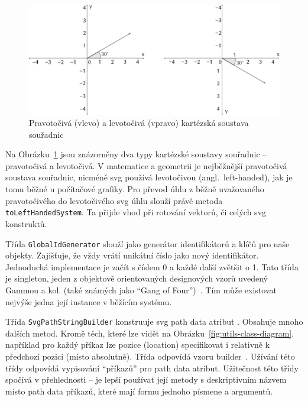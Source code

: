 \begin{figure}[!htb]
  \centering
  \includegraphics[width=\maxwidth{\textwidth}]{../img/cartesian-systems.pdf}
  \caption[Pravotočivá a levotočivá kartézská soustava souřadnic]{Pravotočivá (vlevo) a levotočivá (vpravo) kartézská soustava souřadnic}
  \label{fig:cartesian-systems}
\end{figure}

Na Obrázku~\ref{fig:cartesian-systems} jsou znázorněny dva typy kartézské soustavy souřadnic -- pravotočivá a levotočivá.
V matematice a geometrii je nejběžnější pravotočivá soustava souřadnic, nicméně \acrshort{svg} používá levotočivou (angl.~left-handed), jak je tomu běžné u počítačové grafiky.
Pro převod úhlu z běžně uvažovaného pravotočivého do levotočivého \acrshort{svg} úhlu slouží právě metoda \texttt{toLeftHandedSystem}.
Ta přijde vhod při rotování vektorů, či celých \acrshort{svg} konstruktů.

Třída \texttt{GlobalIdGenerator} slouží jako generátor identifikátorů a klíčů pro naše objekty.
Zajišťuje, že vždy vrátí unikátní číslo jako nový identifikátor.
Jednoduchá implementace je začít s číslem 0 a každé další zvětšit o 1.
Tato třída je singleton, jeden z objektově orientovaných designových vzorů uvedený Gammou a kol. (také známých jako \enquote{Gang of Four})~\cite[s.~144]{gamma_designpatterns_1995}.
Tím může existovat nejvýše jedna její instance v běžícím systému.

Třída \texttt{SvgPathStringBuilder} konstruuje \acrshort{svg} path data atribut \cite[\S~9.3]{brinza_svg_2018}.
Obsahuje mnoho dalších metod.
Kromě těch, které lze vidět na Obrázku~\ref{fig:utils-class-diagram}, například pro každý příkaz lze pozice (location) specifikovat i relativně k předchozí pozici (místo absolutně).
Třída odpovídá vzoru builder~\cite[s.~110]{gamma_designpatterns_1995}.
Užívání této třídy odpovídá vypisování \enquote{příkazů} pro path data atribut.
Užitečnost této třídy spočívá v přehlednosti -- je lepší používat její metody s deskriptivním názvem místo path data příkazů, které mají formu jednoho písmene a argumentů.

